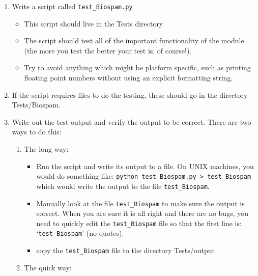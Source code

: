 \documentclass{report}
\begin{document}
\begin{enumerate}
  \item Write a script called \verb|test_Biospam.py|

  \begin{itemize}

    \item This script should live in the Tests directory
      
     \item The script should test all of the important functionality of the module (the more you test the better your test is, of course!).
    
     \item Try to avoid anything which might be platform specific, such as printing floating point numbers without using an explicit formatting string.
  \end{itemize}
      
  \item If the script requires files to do the testing, these should go in
       the directory Tests/Biospam.
      
  \item Write out the test output and verify the output to be correct.
       There are two ways to do this:

  \begin{enumerate}
    \item The long way:

    \begin{itemize}
      
     \item Run the script and write its output to a file. On UNIX machines,
       you would do something like: \verb|python test_Biospam.py > test_Biospam| which would write the output to the file \verb|test_Biospam|.
      
     \item Manually look at the file \verb|test_Biospam| to make sure the output is correct. When you are sure it is all right and there are no bugs, you need to quickly edit the \verb|test_Biospam| file so that the first line is: `\verb|test_Biospam|' (no quotes).

     \item copy the \verb|test_Biospam| file to the directory Tests/output
    
   \end{itemize}

   \item The quick way:


\end{enumerate}
\end{enumerate}
\end{document}
